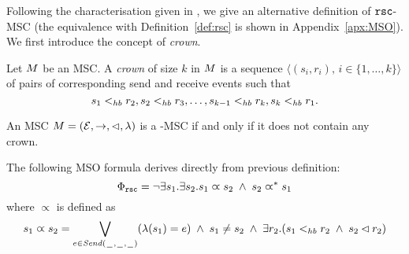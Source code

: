 Following the characterisation given in \cite[Theorem 4.4]{DBLP:journals/dc/Charron-BostMT96}, we  give an alternative definition of $\mathtt{rsc}$-MSC (the equivalence with Definition~\ref{def:rsc} is shown in Appendix~\ref{apx:MSO}). We first  introduce the concept of \emph{crown}.

\begin{definition} [crown]
	Let $M$ be an MSC. A \emph{crown} of size $k$ in $M$ is a sequence $\langle(s_i,r_i),\, i \in \{1,\dots,k\}\rangle$ of pairs of corresponding send and receive events such that
	\[
		s_1 <_{hb} r_2, s_2 <_{hb} r_3, \dots, s_{k-1} <_{hb} r_k, s_k <_{hb} r_1.
	\]
\end{definition}

\begin{definition} \label{def:rsc_alt}
	An MSC $M = (\mathcal{E},\to,\lhd,\lambda)$ is a \rsc-MSC if and only if it does not contain any crown.
\end{definition}


The following MSO formula derives directly from previous  definition:
\[\Phi_{\mathtt{rsc}} = \neg \exists s_1.\exists s_2. s_1 \varpropto s_2 \;\wedge\; s_2 \varpropto^\ast s_1
\]
\noindent where $\varpropto$ is defined as
\[
s_1 \varpropto s_2 =
\bigvee_{\substack{e \in {\mathit{Send}(\hspace{0.1em}\underline{\hspace{0.5em}}\hspace{0.1em},\hspace{0.1em}\underline{\hspace{0.5em}}\hspace{0.1em},\hspace{0.1em}\underline{\hspace{0.5em}}\hspace{0.1em})}}}(\lambda(s_1) = e) \;\wedge\;
s_1 \neq s_2 \;\wedge\;
\exists r_2. (s_1 <_{hb} r_2 \;\wedge\; s_2 \lhd r_2)
\]


